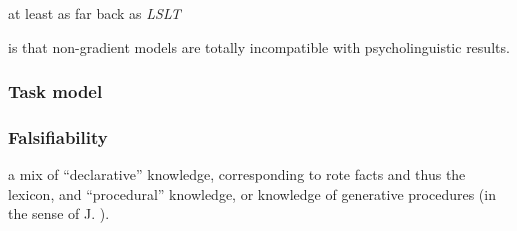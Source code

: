 
at least as far back as \emph{LSLT} \citep{LSLT}

is that non-gradient models are totally incompatible with psycholinguistic results.

\subsubsection{Task model}

\citet[][16]{Schutze1996}

\citet{Schutze2005}
\citet{Schutze2011}


\subsubsection{Falsifiability}

\citet{Armstrong1983}

\citet{Yang2008a}

a mix of ``declarative'' knowledge,
corresponding to rote facts and thus the lexicon,
and ``procedural'' knowledge, or knowledge of generative procedures 
(in the sense of J. \citealt{Anderson1993}). 

\citet{Logan1988}
\citet{Sfard1991}
\citet{Delazer2005}


